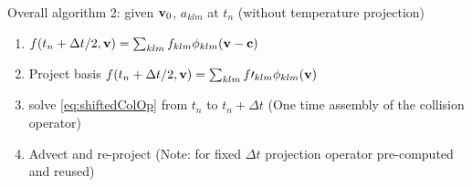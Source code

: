 \documentclass{article}[draft]
\begin{document}
\newpage
Overall algorithm 2: given $\mathbf{v}_0$, $a_{klm}$ at $t_n$ (without temperature projection)
\begin{enumerate}
	\item $f(t_n + \Delta t /2, \vect{v} ) = \sum_{klm} f_{klm} \phi_{klm}\of{\vect{v}-\vect{c}} $ %
	\item Project basis $f(t_n + \Delta t /2, \mathbf{v} )= \sum_{klm} f\prime_{klm} \phi_{klm}(\mathbf{v})$
	\item solve \eqref{eq:shiftedColOp} from $t_n$ to $t_n + \Delta t$ (One time assembly of the collision operator)
	\item Advect and re-project (Note: for fixed $\Delta t $ projection operator pre-computed and reused) 
\end{enumerate}






%
\end{document}
